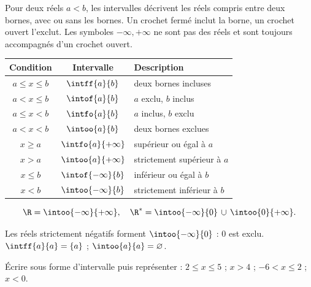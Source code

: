 \begin{keypoint}[Notations]
Pour deux réels $a<b$, les intervalles décrivent les réels compris entre deux bornes, avec ou sans les bornes. Un crochet fermé inclut la borne, un crochet ouvert l'exclut. Les symboles $-\infty,+\infty$ ne sont pas des réels et sont toujours accompagnés d'un crochet ouvert.
\end{keypoint}
\begin{center}\begin{tabular}{c|c|l}
\textbf{Condition}&\textbf{Intervalle}&\textbf{Description}\\\hline
$a\leq x\leq b$&$\intff{a}{b}$&deux bornes incluses\\
$a<x\leq b$&$\intof{a}{b}$&$a$ exclu, $b$ inclus\\
$a\leq x<b$&$\intfo{a}{b}$&$a$ inclus, $b$ exclu\\
$a<x<b$&$\intoo{a}{b}$&deux bornes exclues\\
$x\geq a$&$\intfo{a}{+\infty}$&supérieur ou égal à $a$\\
$x>a$&$\intoo{a}{+\infty}$&strictement supérieur à $a$\\
$x\leq b$&$\intof{-\infty}{b}$&inférieur ou égal à $b$\\
$x<b$&$\intoo{-\infty}{b}$&strictement inférieur à $b$
\end{tabular}\end{center}
\[\R=\intoo{-\infty}{+\infty},\quad \R^*=\intoo{-\infty}{0}\,\cup\,\intoo{0}{+\infty}.\]
\begin{pitfall}Les réels strictement négatifs forment $\intoo{-\infty}{0}$ : $0$ est exclu. $\intff{a}{a}=\{a\}$ ; $\intoo{a}{a}=\varnothing$.\end{pitfall}
\begin{example}Écrire sous forme d'intervalle puis représenter : $2\leq x\leq5$ ; $x>4$ ; $-6<x\leq2$ ; $x<0$.\end{example}


